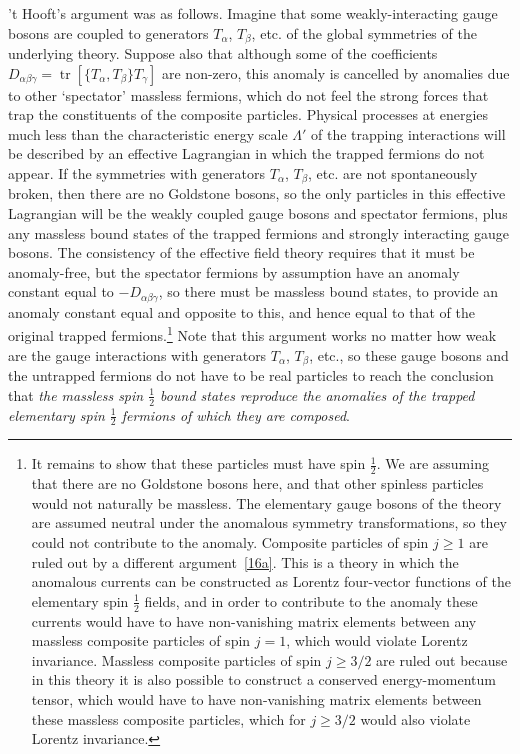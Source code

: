 't Hooft's argument was as follows. Imagine that some weakly-interacting
gauge bosons are coupled to generators $T_\alpha$, $T_\beta$, etc. of the
global symmetries of the underlying theory. Suppose also that although some
of the coefficients
$D_{\alpha\beta\gamma}=\operatorname{tr}[\{T_\alpha,T_\beta\}T_\gamma]$
are non-zero, this anomaly is cancelled by anomalies due to other
`spectator' massless fermions, which do not feel the strong forces that
trap the constituents of the composite particles. Physical processes at
energies much less than the characteristic energy scale $\Lambda'$ of the
trapping interactions will be described by an effective Lagrangian in
which the trapped fermions do not appear. If the symmetries with generators
$T_\alpha$, $T_\beta$, etc. are not spontaneously broken, then there are
no Goldstone bosons, so the only particles in this effective Lagrangian
will be the weakly coupled gauge bosons and spectator fermions, plus any
massless bound states of the trapped fermions and strongly interacting
gauge bosons. The consistency of the effective field theory requires that
it must be anomaly-free, but the spectator fermions by assumption have an
anomaly constant equal to $-D_{\alpha\beta\gamma}$, so there must be
massless bound states, to provide an anomaly constant equal and opposite to
this, and hence equal to that of the original trapped fermions.\footnote{It
remains to show that these particles must have spin $\frac12$. We are
assuming that there are no Goldstone bosons here, and that other spinless
particles would not naturally be massless. The elementary gauge bosons of
the theory are assumed neutral under the anomalous symmetry
transformations, so they could not contribute to the anomaly. Composite
particles of spin $j\geq1$ are ruled out by a different
argument~\hyperref[ch22-ref-16a]{[16a]}. This is a theory in which the
anomalous currents can be constructed as Lorentz four-vector functions of
the elementary spin $\frac12$ fields, and in order to contribute to the
anomaly these currents would have to have non-vanishing matrix elements
between any massless composite particles of spin $j=1$, which would
violate Lorentz invariance. Massless composite particles of spin
$j\geq3/2$ are ruled out because in this theory it is also possible to
construct a conserved energy-momentum tensor, which would have to have
non-vanishing matrix elements between these massless composite particles,
which for $j\geq3/2$ would also violate Lorentz invariance.} Note that this
argument works no matter how weak are the gauge interactions with
generators $T_\alpha$, $T_\beta$, etc., so these gauge bosons and the
untrapped fermions do not have to be real particles to reach the conclusion
that \emph{the massless spin $\frac12$ bound states reproduce the anomalies
of the trapped elementary spin $\frac12$ fermions of which they are
composed}.

